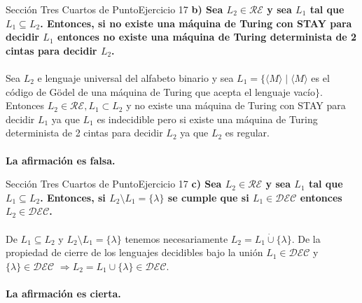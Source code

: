 \documentclass[10pt, envcountsect, presentation, aspectratio=169]{beamer}
\newcommand{\ld}{\ensuremath{\mathcal {DEC}}}
\newcommand{\lr}{\ensuremath{\mathcal {RE}}}
\begin{document}

\begin{frame}{Sección Tres Cuartos de Punto}{Ejercicio 17}
    \textbf{b) Sea $L_2 \in \lr$ y sea $L_1$ tal que $L_1 \subseteq L_2$. Entonces, si no  existe una máquina de Turing con  STAY para decidir $L_1$ entonces no existe una máquina de Turing determinista de 2 cintas para decidir $L_2$.}\\~\\

    Sea $L_2$ e lenguaje universal del alfabeto binario y sea $L_1=\{ \langle M \rangle \mid \langle M \rangle$ es el código de Gödel de una máquina de Turing que acepta el lenguaje vacío$\}$.
    Entonces $L_2 \in \mathcal{RE}, L_1 \subset L_2$ y no existe una máquina de Turing con STAY para decidir $L_1$ ya que $L_1$ es indecidible pero si existe una máquina de Turing determinista de 2 cintas para decidir $L_2$ ya que $L_2$ es regular.\\~\\

    \textbf{La afirmación es falsa.}
\end{frame}


\begin{frame}{Sección Tres Cuartos de Punto}{Ejercicio 17}
    \textbf{c) Sea $L_2 \in \lr$ y sea $L_1$ tal que $L_1 \subseteq L_2$. Entonces, si $L_2 \setminus L_1=\{\lambda\}$ se cumple que si $L_1 \in \ld$ entonces $L_2 \in \ld$.}\\~\\

    De $L_1 \subseteq L_2$ y $L_2 \setminus L_1 = \{\lambda\}$ tenemos necesariamente $L_2 = L_1 \dot{\cup} \{\lambda\}$.
    De la propiedad de cierre de los lenguajes decidibles bajo la unión $L_1 \in \mathcal{DEC}$ y $\{\lambda\} \in \mathcal{DEC}$ $\Rightarrow L_2 = L_1 \cup \{\lambda\} \in \mathcal{DEC}.$\\~\\

    \textbf{La afirmación es cierta.}

\end{frame}

\end{document}
